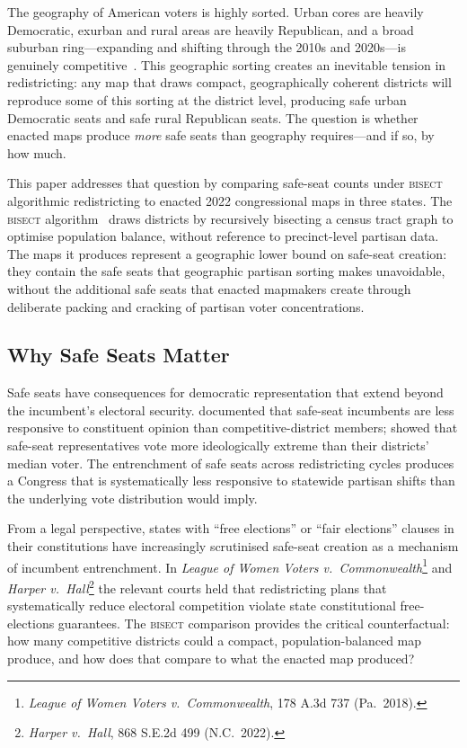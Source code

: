 \label{sec:introduction}

The geography of American voters is highly sorted. Urban cores are heavily Democratic,
exurban and rural areas are heavily Republican, and a broad suburban ring---expanding
and shifting through the 2010s and 2020s---is genuinely competitive~\citep{rodden2019why}.
This geographic sorting creates an inevitable tension in redistricting: any map that draws
compact, geographically coherent districts will reproduce some of this sorting at the
district level, producing safe urban Democratic seats and safe rural Republican seats.
The question is whether enacted maps produce \textit{more} safe seats than geography
requires---and if so, by how much.

This paper addresses that question by comparing safe-seat counts under \textsc{bisect}
algorithmic redistricting to enacted 2022 congressional maps in three states. The
\textsc{bisect} algorithm~\citep{bisect2024} draws districts by recursively bisecting
a census tract graph to optimise population balance, without reference to precinct-level
partisan data. The maps it produces represent a geographic lower bound on safe-seat
creation: they contain the safe seats that geographic partisan sorting makes unavoidable,
without the additional safe seats that enacted mapmakers create through deliberate packing
and cracking of partisan voter concentrations.

\subsection{Why Safe Seats Matter}

Safe seats have consequences for democratic representation that extend beyond the
incumbent's electoral security. \citet{fiorina1980incumbency} documented that safe-seat
incumbents are less responsive to constituent opinion than competitive-district members;
\citet{stonecash2003parties} showed that safe-seat representatives vote more ideologically
extreme than their districts' median voter. The entrenchment of safe seats across
redistricting cycles produces a Congress that is systematically less responsive to
statewide partisan shifts than the underlying vote distribution would imply.

From a legal perspective, states with ``free elections'' or ``fair elections'' clauses
in their constitutions have increasingly scrutinised safe-seat creation as a mechanism
of incumbent entrenchment. In \textit{League of Women Voters v.\ Commonwealth}\footnote{
\textit{League of Women Voters v.\ Commonwealth}, 178 A.3d 737 (Pa.\ 2018).} and
\textit{Harper v.\ Hall}\footnote{\textit{Harper v.\ Hall}, 868 S.E.2d 499 (N.C.\ 2022).}
the relevant courts held that redistricting plans that systematically reduce electoral
competition violate state constitutional free-elections guarantees. The \textsc{bisect}
comparison provides the critical counterfactual: how many competitive districts could
a compact, population-balanced map produce, and how does that compare to what the enacted
map produced?

